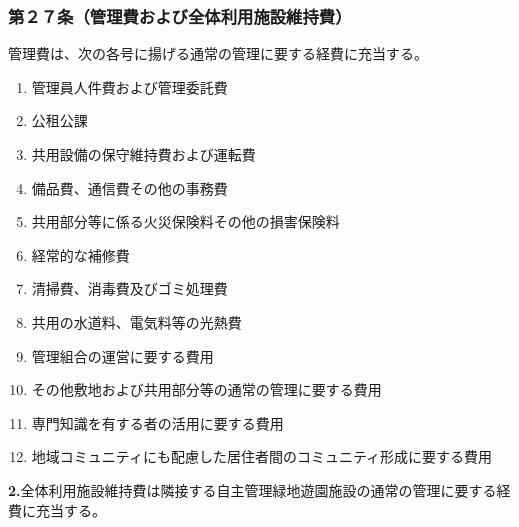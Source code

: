 \documentclass[12pt,uplatex]{jsarticle}
\begin{document}
\subsubsection*{第２７条（管理費および全体利用施設維持費）}
管理費は、次の各号に揚げる通常の管理に要する経費に充当する。
\begin{enumerate}
\item 管理員人件費および管理委託費
\item 公租公課
\item 共用設備の保守維持費および運転費
\item 備品費、通信費その他の事務費
\item 共用部分等に係る火災保険料その他の損害保険料
\item 経常的な補修費
\item 清掃費、消毒費及びゴミ処理費
\item 共用の水道料、電気料等の光熱費
\item 管理組合の運営に要する費用
\item その他敷地および共用部分等の通常の管理に要する費用
\item 専門知識を有する者の活用に要する費用
\item 地域コミュニティにも配慮した居住者間のコミュニティ形成に要する費用
\end{enumerate}
\textbf{2.}全体利用施設維持費は隣接する自主管理緑地遊園施設の通常の管理に要する経費に充当する。
\end{document}
